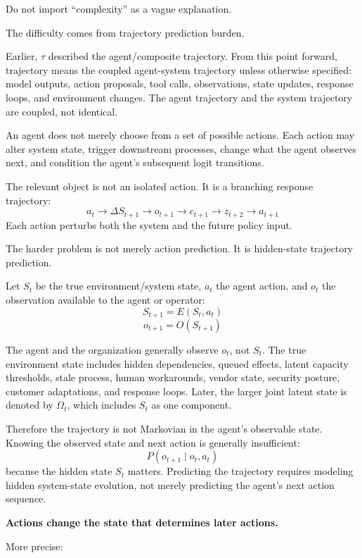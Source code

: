 \documentclass[11pt]{article}
\begin{document}
Do not import ``complexity'' as a vague explanation.

The difficulty comes from trajectory prediction burden.

Earlier, $\tau$ described the agent/composite trajectory. From this point forward, trajectory means the coupled agent-system trajectory unless otherwise specified: model outputs, action proposals, tool calls, observations, state updates, response loops, and environment changes. The agent trajectory and the system trajectory are coupled, not identical.

An agent does not merely choose from a set of possible actions. Each action may alter system state, trigger downstream processes, change what the agent observes next, and condition the agent's subsequent logit transitions.

The relevant object is not an isolated action. It is a branching response trajectory:
\[
a_t \rightarrow \Delta S_{t+1} \rightarrow o_{t+1} \rightarrow c_{t+1} \rightarrow z_{t+2} \rightarrow a_{t+1}
\]
Each action perturbs both the system and the future policy input.

The harder problem is not merely action prediction. It is hidden-state trajectory prediction.

Let $S_t$ be the true environment/system state, $a_t$ the agent action, and $o_t$ the observation available to the agent or operator:
\[
S_{t+1} = E(S_t, a_t)
\]
\[
o_{t+1} = O(S_{t+1})
\]

The agent and the organization generally observe $o_t$, not $S_t$. The true environment state includes hidden dependencies, queued effects, latent capacity thresholds, stale process, human workarounds, vendor state, security posture, customer adaptations, and response loops. Later, the larger joint latent state is denoted by $\Omega_t$, which includes $S_t$ as one component.

Therefore the trajectory is not Markovian in the agent's observable state. Knowing the observed state and next action is generally insufficient:
\[
P(o_{t+1} \mid o_t, a_t)
\]
because the hidden state $S_t$ matters. Predicting the trajectory requires modeling hidden system-state evolution, not merely predicting the agent's next action sequence.

\begin{pullquote}
\textbf{Actions change the state that determines later actions.}
\end{pullquote}

More precise:
\end{document}
